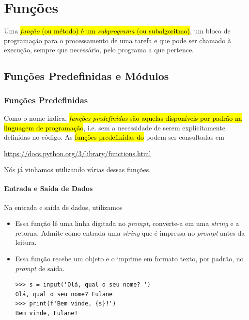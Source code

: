 \chapter{Funções}\label{cap_fun}

Uma \hl{\emph{função} (ou método) é um \emph{subprograma} (ou subalgoritmo)}, um bloco de programação para o processamento de uma tarefa e que pode ser chamado à execução, sempre que necessário, pelo programa a que pertence.

\section{Funções Predefinidas e Módulos}\label{cap_fun_sec_buildin}

\subsection{Funções Predefinidas}

Como o nome indica, \hl{\emph{funções predefinidas} são aquelas disponíveis por padrão na linguagem de programação}, i.e. sem a necessidade de serem explicitamente definidas no código. As \hl{funções predefinidas do {\python}} podem ser consultadas em
\begin{center}
  \url{https://docs.python.org/3/library/functions.html}
\end{center}

Nós já vinhamos utilizando várias dessas funções.

\subsubsection{Entrada e Saída de Dados}

Na entrada e saída de dados, utilizamos
\begin{itemize}
\item {\PYTHONinput} 

  Essa função lê uma linha digitada no \textit{prompt}, converte-a em uma \textit{string} e a retorna. Admite como entrada uma \textit{string} que é impressa no \textit{prompt} antes da leitura.

\item {\PYTHONprint} 

  Essa função recebe um objeto e o imprime em formato texto, por padrão, no \textit{prompt} de saída.

\begin{lstlisting}[xrightmargin=2.5em]
>>> s = input('Olá, qual o seu nome? ')
Olá, qual o seu nome? Fulane
>>> print(f'Bem vinde, {s}!')
Bem vinde, Fulane!
\end{lstlisting}

\end{itemize}

